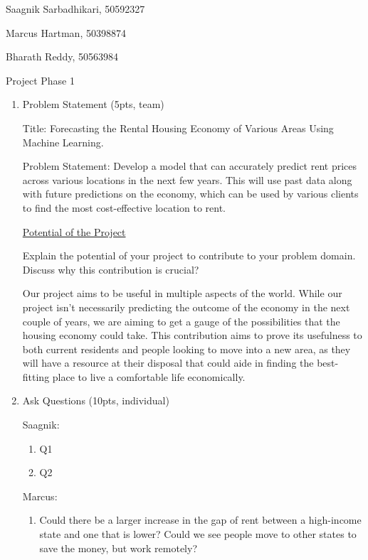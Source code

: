 \documentclass[a4paper]{article}
\begin{document}
Saagnik Sarbadhikari, 50592327 

Marcus Hartman, 50398874

Bharath Reddy, 50563984

\begin{center}
  Project Phase 1
\end{center}

\begin{enumerate}
  \item Problem Statement (5pts, team)
  
  Title: Forecasting the Rental Housing Economy of Various Areas Using Machine Learning.

  Problem Statement: Develop a model that can accurately predict rent prices across various locations in the next few years. This will use past data along with future predictions on the economy, which can be used by various clients to find the most cost-effective location to rent.

  \bigbreak
  \underline{Potential of the Project}
  
  Explain the potential of your project to contribute to your problem domain. Discuss why this contribution is crucial?

  Our project aims to be useful in multiple aspects of the world. While our project isn't necessarily predicting the outcome of the economy in the next couple of years, we are aiming to get a gauge of the possibilities that the housing economy could take. This contribution aims to prove its usefulness to both current residents and people looking to move into a new area, as they will have a resource at their disposal that could aide in finding the best-fitting place to live a comfortable life economically.

  \item Ask Questions (10pts, individual)
  
  Saagnik:

  \begin{enumerate}
    \item Q1
    \item Q2
  \end{enumerate}

  Marcus:

  \begin{enumerate}
    \item Could there be a larger increase in the gap of rent between a high-income state and one that is lower? Could we see people move to other states to save the money, but work remotely?
    

\end{enumerate}
\end{enumerate}
\end{document}
